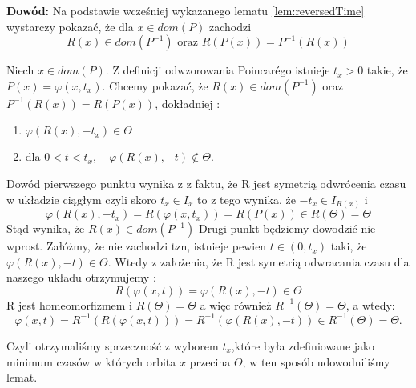 \textbf{Dowód:}
Na podstawie wcześniej wykazanego lematu \eqref{lem:reversedTime} wystarczy pokazać, że dla $ x\in dom(P) $ 
zachodzi
$$
  R(x) \in dom(P^{-1}) \mbox{ oraz } R(P(x)) = P^{-1}(R(x))
$$

Niech $ x \in dom(P)$. Z definicji odwzorowania Poincar\'ego istnieje $ t_x > 0 $ takie, że $ P(x) = \varphi(x,t_x)$.
Chcemy pokazać, że $ R(x) \in dom(P^{-1}) $ oraz $ P^{-1}(R(x)) = R(P(x)) $, dokładniej :
\begin{enumerate}
 \item $\varphi(R(x),-t_x) \in \Theta $
 \item dla $ 0 < t < t_x, \quad \varphi(R(x),-t) \notin \Theta$.
\end{enumerate}
Dowód pierwszego punktu wynika z z faktu, że R jest symetrią odwrócenia czasu w układzie ciągłym czyli skoro 
$ t_x \in I_x $ to z tego wynika, że  $ -t_x \in I_{R(x)} $ i 
$$
  \varphi(R(x),-t_x) = R(\varphi(x,t_x)) = R(P(x)) \in R(\Theta)= \Theta
$$
Stąd wynika, że $ R(x) \in dom(P^{-1})$ 
Drugi punkt będziemy dowodzić nie-wprost. Załóżmy, że nie zachodzi tzn, istnieje pewien 
$ t \in (0,t_x) $ taki, że $ \varphi(R(x),-t) \in \Theta $. Wtedy z założenia, że R
jest symetrią odwracania czasu dla naszego układu otrzymujemy :
 $$
  R(\varphi(x,t)) = \varphi(R(x), -t) \in \Theta
 $$ 
 R jest homeomorfizmem i $ R(\Theta) = \Theta $ a więc również $ R^{-1}(\Theta) = \Theta $,
 a wtedy:
 $$
    \varphi(x,t) = R^{-1}(R(\varphi(x,t))) = R^{-1}(\varphi(R(x),-t)) \in R^{-1}(\Theta) = \Theta.
 $$

 Czyli otrzymaliśmy sprzeczność z wyborem $t_x$,które była zdefiniowane jako minimum czasów w których orbita
 $ x $ przecina $\Theta$, w ten sposób udowodniliśmy lemat.
 